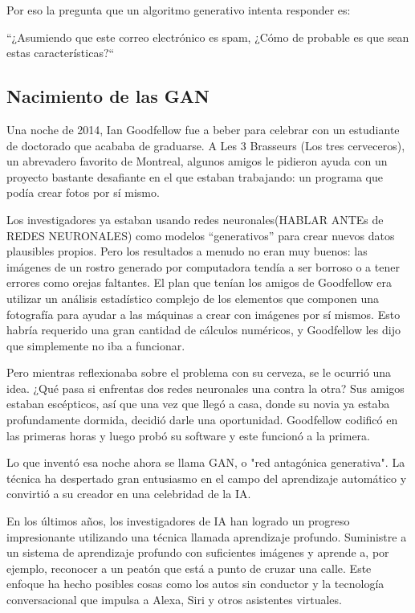 \documentclass[a4paper]{article}
\begin{document}
Por eso la pregunta que un algoritmo generativo intenta responder es:

``¿Asumiendo que este correo electrónico es spam, ¿Cómo de probable es que sean estas características?``

\subsection{Nacimiento de las GAN}
Una noche de 2014, Ian Goodfellow fue a beber para celebrar con un estudiante de doctorado que acababa de graduarse. A
Les 3 Brasseurs (Los tres cerveceros), un abrevadero favorito de Montreal, algunos amigos le pidieron ayuda con un proyecto bastante desafiante en el que estaban trabajando: un programa que podía crear fotos por sí mismo.

Los investigadores ya estaban usando redes neuronales(HABLAR ANTEs de REDES NEURONALES) como
modelos “generativos” para crear nuevos datos plausibles propios. Pero los resultados a menudo no eran muy buenos: las imágenes de un rostro generado por computadora tendía a ser borroso o a tener errores como orejas faltantes. El plan que tenían los amigos de Goodfellow era utilizar un análisis estadístico complejo de los elementos que componen una fotografía para ayudar a las máquinas a crear
con imágenes por sí mismos. Esto habría requerido una gran cantidad de cálculos numéricos, y Goodfellow les dijo que
simplemente no iba a funcionar.

Pero mientras reflexionaba sobre el problema con su cerveza, se le ocurrió una idea. ¿Qué pasa si enfrentas dos redes neuronales una contra la otra? Sus amigos estaban escépticos, así que una vez que llegó a casa, donde su novia ya estaba profundamente dormida, decidió
darle una oportunidad. Goodfellow codificó en las primeras horas y luego probó su software y este funcionó a la primera.

Lo que inventó esa noche ahora se llama GAN, o "red antagónica generativa". La técnica ha despertado gran
entusiasmo en el campo del aprendizaje automático y convirtió a su creador en una celebridad de la IA.

En los últimos años, los investigadores de IA han logrado un progreso impresionante utilizando una técnica llamada aprendizaje profundo. Suministre a un
sistema de aprendizaje profundo con suficientes imágenes y aprende a, por ejemplo, reconocer a un peatón que está a punto de cruzar una calle. Este enfoque ha hecho posibles cosas como los autos sin conductor y la tecnología conversacional que impulsa a Alexa, Siri y otros asistentes virtuales.
\end{document}

